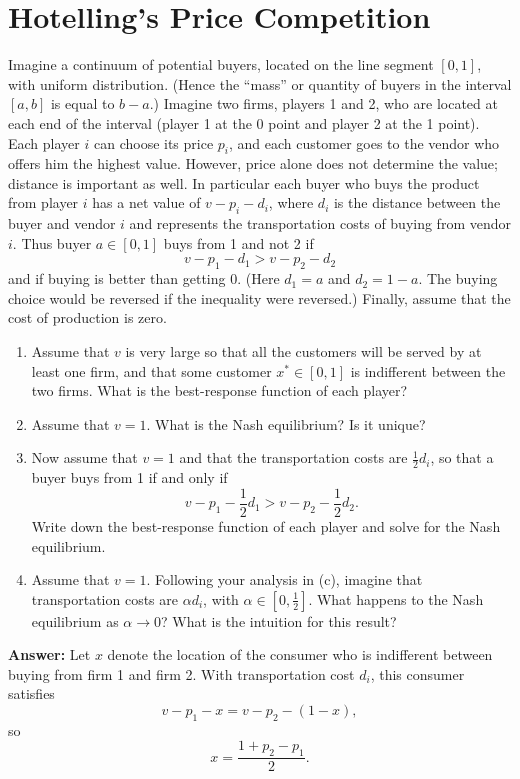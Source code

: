 \documentclass[12pt,a4paper]{article}
\begin{document}
\section{Hotelling's Price Competition}
Imagine a continuum of potential buyers, located on the line segment $[0,1]$, with uniform distribution. (Hence the ``mass'' or quantity of buyers in the interval $[a,b]$ is equal to $b-a$.) Imagine two firms, players 1 and 2, who are located at each end of the interval (player 1 at the 0 point and player 2 at the 1 point). Each player $i$ can choose its price $p_i$, and each customer goes to the vendor who offers him the highest value. However, price alone does not determine the value; distance is important as well. In particular each buyer who buys the product from player $i$ has a net value of $v-p_i-d_i$, where $d_i$ is the distance between the buyer and vendor $i$ and represents the transportation costs of buying from vendor $i$. Thus buyer $a\in[0,1]$ buys from 1 and not 2 if
\[
    v-p_1-d_1 > v-p_2-d_2
\]
and if buying is better than getting 0. (Here $d_1=a$ and $d_2=1-a$. The buying choice would be reversed if the inequality were reversed.) Finally, assume that the cost of production is zero.
\begin{enumerate}[label=(\alph*)]
  \item Assume that $v$ is very large so that all the customers will be served by at least one firm, and that some customer $x^* \in [0,1]$ is indifferent between the two firms. What is the best-response function of each player?
  \item Assume that $v=1$. What is the Nash equilibrium? Is it unique?
  \item  Now assume that $v=1$ and that the transportation costs are $\frac{1}{2}d_i$, so that a buyer buys from 1 if and only if
  \[
      v-p_1-\frac{1}{2}d_1 > v-p_2-\frac{1}{2}d_2.
  \]
  Write down the best-response function of each player and solve for the Nash equilibrium.
  \item Assume that $v=1$. Following your analysis in (c), imagine that transportation costs are $\alpha d_i$, with $\alpha\in[0,\frac{1}{2}]$. What happens to the Nash equilibrium as $\alpha\to 0$? What is the intuition for this result?
\end{enumerate}

\vspace{0.5cm}

\noindent\textbf{Answer:} Let $x$ denote the location of the consumer who is indifferent between buying from firm 1 and firm 2. With transportation cost $d_i$, this consumer satisfies
\[
    v-p_1-x=v-p_2-(1-x),
\]
so
\[
    x=\frac{1+p_2-p_1}{2}.
\]
\end{document}
